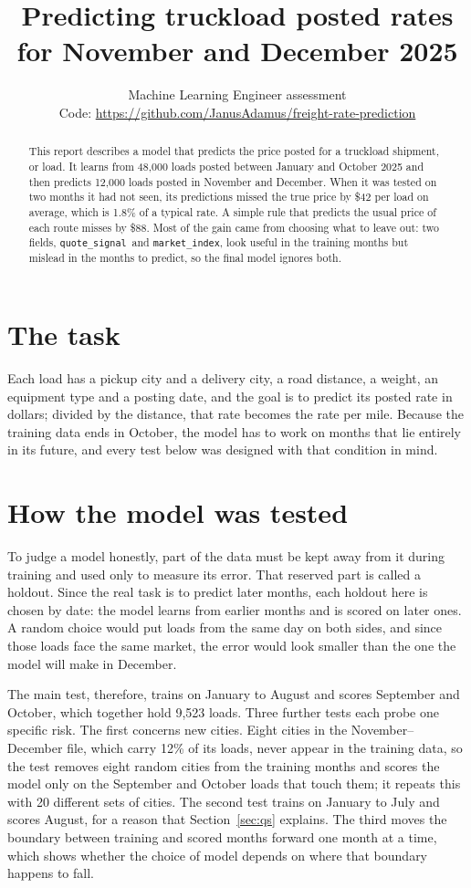 \documentclass[11pt,a4paper]{article}
\title{Predicting truckload posted rates for November and December 2025}
\author{Machine Learning Engineer assessment\\[2pt]
\small Code: \url{https://github.com/JanusAdamus/freight-rate-prediction}}
\date{}
\newcommand{\var}[1]{\texttt{#1}}
\newcommand{\qs}{\var{quote\_signal}}
\newcommand{\mi}{\var{market\_index}}
\begin{document}
\maketitle
\vspace{-1.5em}

\begin{abstract}
\noindent
This report describes a model that predicts the price posted for a truckload shipment, or load.
It learns from 48,000 loads posted between January and October 2025 and then predicts 12,000 loads posted in November and December.
When it was tested on two months it had not seen, its predictions missed the true price by \$42 per load on average, which is 1.8\% of a typical rate.
A simple rule that predicts the usual price of each route misses by \$88.
Most of the gain came from choosing what to leave out: two fields, \qs\ and \mi, look useful in the training months but mislead in the months to predict, so the final model ignores both.
\end{abstract}

\section{The task}

Each load has a pickup city and a delivery city, a road distance, a weight, an equipment type and a posting date, and the goal is to predict its posted rate in dollars; divided by the distance, that rate becomes the rate per mile.
Because the training data ends in October, the model has to work on months that lie entirely in its future, and every test below was designed with that condition in mind.

\section{How the model was tested}

To judge a model honestly, part of the data must be kept away from it during training and used only to measure its error.
That reserved part is called a holdout.
Since the real task is to predict later months, each holdout here is chosen by date: the model learns from earlier months and is scored on later ones.
A random choice would put loads from the same day on both sides, and since those loads face the same market, the error would look smaller than the one the model will make in December.

The main test, therefore, trains on January to August and scores September and October, which together hold 9,523 loads.
Three further tests each probe one specific risk.
The first concerns new cities.
Eight cities in the November--December file, which carry 12\% of its loads, never appear in the training data, so the test removes eight random cities from the training months and scores the model only on the September and October loads that touch them; it repeats this with 20 different sets of cities.
The second test trains on January to July and scores August, for a reason that Section~\ref{sec:qs} explains.
The third moves the boundary between training and scored months forward one month at a time, which shows whether the choice of model depends on where that boundary happens to fall.
\end{document}
